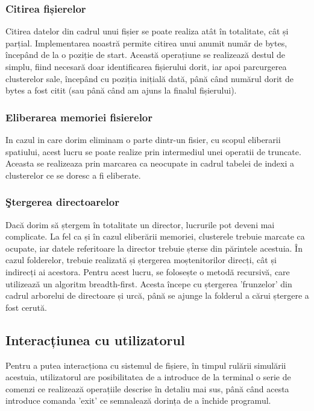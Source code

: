 \subsubsection{Citirea fișierelor}

Citirea datelor din cadrul unui fișier se poate realiza atât în totalitate, cât și parțial. Implementarea noastră permite citirea unui anumit număr de bytes, începând de la o poziție de start. Această operațiune se realizează destul de simplu, fiind necesară doar identificarea fișierului dorit, iar apoi parcurgerea clusterelor sale, începând cu poziția inițială dată, până când numărul dorit de bytes a fost citit (sau până când am ajuns la finalul fișierului).


\subsubsection{Eliberarea memoriei fisierelor}

In cazul in care dorim eliminam o parte dintr-un fisier, cu scopul eliberarii spatiului, acest lucru se poate realize prin intermediul unei operatii de truncate. Aceasta se realizeaza prin marcarea ca neocupate in cadrul tabelei de indexi a clusterelor ce se doresc a fi eliberate. 


\subsubsection{Ştergerea directoarelor}

Dacă dorim să ștergem în totalitate un director, lucrurile pot deveni mai complicate. La fel ca și în cazul eliberării memoriei, clusterele trebuie marcate ca ocupate, iar datele referitoare la director trebuie șterse din părintele acestuia. În cazul folderelor, trebuie realizată și ștergerea moștenitorilor direcți, cât și indirecți ai acestora. Pentru acest lucru, se folosește o metodă recursivă, care utilizează un algoritm breadth-first. Acesta începe cu ștergerea 'frunzelor' din cadrul arborelui de directoare și urcă, până se ajunge la folderul a cărui ștergere a fost cerută.


\subsection{Interacțiunea cu utilizatorul}

Pentru a putea interacționa cu sistemul de fișiere, în timpul rulării simulării acestuia, utilizatorul are posibilitatea de a introduce de la terminal o serie de comenzi ce realizează operațiile descrise în detaliu mai sus, până când acesta introduce comanda 'exit' ce semnalează dorința de a închide programul.

